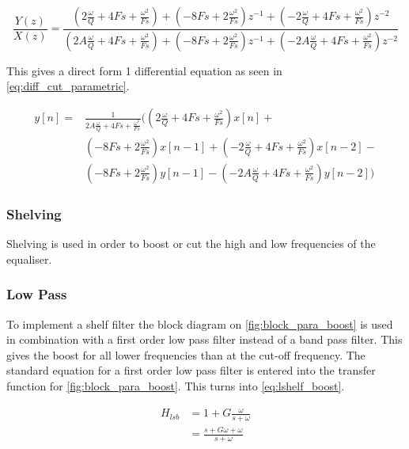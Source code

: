 \begin{equation}\label{eq:tf_cut}
	\frac{Y(z)}{X(z)} = \frac{( 2 \frac{ \omega }{ Q }  + 4 Fs + \frac{\omega ^ 2}{Fs})+ ( -8 Fs + 2 \frac{\omega ^ 2}{Fs}) z ^ { -1 } + (- 2 \frac{ \omega } { Q } + 4 Fs + \frac{\omega ^ 2}{Fs}) z ^ { - 2 } }{ ( 2 A \frac{ \omega }{ Q } + 4 Fs + \frac{\omega ^ 2}{Fs}) + ( -8 Fs + 2 \frac{\omega ^ 2}{Fs}) z ^ { -1 } + (- 2 A \frac{ \omega } { Q }  + 4 Fs + \frac{\omega ^ 2}{Fs}) z ^ { - 2 }}
\end{equation}

This gives a direct form 1 differential equation as seen in \autoref{eq:diff_cut_parametric}.

\begin{equation}\label{eq:diff_cut_parametric}
\begin{split}
 y[n] =&\frac{1}{ 2 A \frac{ \omega }{ Q }  + 4 {Fs} +\frac{\omega ^ 2}{Fs}}((2 \frac{ \omega }{ Q }  + 4 Fs + \frac{\omega ^ 2}{Fs}) x[n] + \\
 & (- 8 Fs + 2 \frac{\omega ^ 2}{Fs} ) x[n-1]  +(- 2 \frac{ \omega } { Q } + 4 Fs + \frac{\omega ^ 2}{Fs}) x[n-2] - \\ 
 & ( -8 Fs + 2 \frac{\omega ^ 2}{Fs} ) y[n-1] - ( -2 A \frac{ \omega } { Q } + 4 Fs +\frac{\omega ^ 2}{Fs}) y[n-2])
\end{split}
\end{equation}


\subsubsection{Shelving}
Shelving is used in order to boost or cut the high and low frequencies of the equaliser.
\subsubsection{Low Pass}

To implement a shelf filter the block diagram on \autoref{fig:block_para_boost} is used in combination with a first order low pass filter instead of a band pass filter. This gives the boost for all lower frequencies than at the cut-off frequency. The standard equation for a first order low pass filter is entered into the transfer function for \autoref{fig:block_para_boost}. This turns into \autoref{eq:lshelf_boost}.

\begin{equation}\label{eq:lshelf_boost}
\begin{split}
H_{lsb} & = 1 + G\frac{\omega}{s+\omega}\\
&=\frac{s+G\omega+\omega}{s+\omega}
\end{split}
\end{equation}

